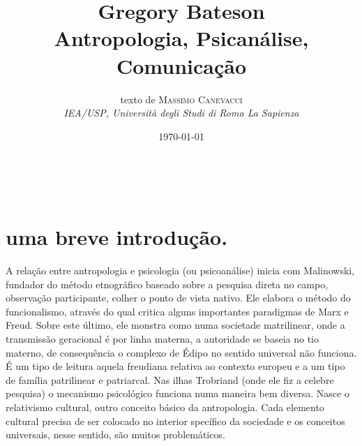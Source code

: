 \documentclass[a4paper, 12pt]{article} %
\title{\textbf{Gregory Bateson}\\ %
Antropologia,  Psicanálise, Comunicação} %
\author{texto de \textsc{Massimo Canevacci} %
\\{\textit{IEA/USP, Università degli Studi di Roma La Sapienza}}} %
\date{\today} %
\makeatletter
\newcommand{\floss}{\textsc{floss}}
\newcommand{\aab}{\textsc{aa}}
\newcommand{\aai}{\textsc{Aa}}
\newcommand{\owl}{{\sc owl}}
\renewcommand{\maketitle}{ %
\begin{flushright} %
{\LARGE\@title} %

\vspace{50pt} %

{\large\@author} %
\\\@date %

\vspace{40pt} %
\end{flushright}
}
\makeatother
\begin{document}
\maketitle %






\newpage
\tableofcontents


\section*{uma breve introdução.}\label{sec:start}
A relação entre antropologia e psicologia (ou psicoanálise) inicia com Malinowski, fundador do método etnográfico baseado sobre a pesquisa direta no campo, observação participante, colher o ponto de vista nativo. Ele elabora o método do funcionalismo, através  do qual critica alguns importantes paradigmas de Marx e Freud. Sobre este último, ele monstra como numa societade matrilinear, onde a transmissão geracional é  por linha materna,  a autoridade se baseia no tio materno, de consequência o complexo de Édipo no sentido universal não funciona. É  um tipo de leitura aquela freudiana relativa ao contexto europeu e a um tipo de família patrilinear e patriarcal. Nas ilhas Trobriand (onde ele fiz a celebre pesquisa) o mecanismo psicológico funciona numa maneira bem diversa. Nasce o relativismo cultural, outro conceito básico da antropologia. Cada elemento cultural precisa de ser colocado no interior specífico da sociedade e os conceitos universais, nesse sentido, são muitos problemáticos. 
\end{document}
